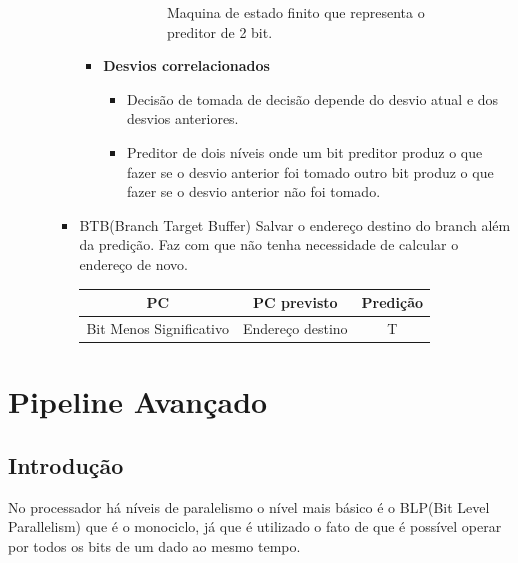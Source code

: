 \documentclass[a4paper]{article}
\begin{document}
\begin{enumerate}
\begin{itemize}
\begin{itemize}
\begin{itemize}
\begin{itemize}
\begin{figure}
                                                \caption{Maquina de estado finito que representa o preditor de 2 bit.}
                                            \end{figure}
                                    \end{itemize}
                                \item  \textbf{Desvios correlacionados}
                                    \begin{itemize}
                                        \item Decisão de tomada de decisão depende do desvio atual e dos desvios
                                            anteriores.
                                        \item Preditor de dois níveis  onde um bit preditor produz o que fazer se o
                                            desvio anterior foi tomado outro bit produz o que fazer se o desvio anterior
                                            não foi tomado.
                                    \end{itemize}
                            \end{itemize}
                        \item BTB(Branch Target Buffer) Salvar o endereço destino do branch além da predição. Faz com
                            que não tenha necessidade de calcular o endereço de novo.
\begin{table}
    \begin{center}
        \begin{tabular}{c|c|c}
            \textbf{PC} & \textbf{PC previsto} & \textbf{Predição}\\
            \hline
            Bit Menos Significativo & Endereço destino & T
        \end{tabular}
    \end{center}
\end{table}
                    \end{itemize}
            \end{itemize}
    \end{enumerate}

\section{Pipeline Avançado}
\subsection{Introdução}
No processador há níveis de paralelismo o nível mais básico é o BLP(Bit Level Parallelism) que é o monociclo, já que é
utilizado o fato de que é possível operar por todos os bits de um dado ao mesmo tempo.
\end{document}
